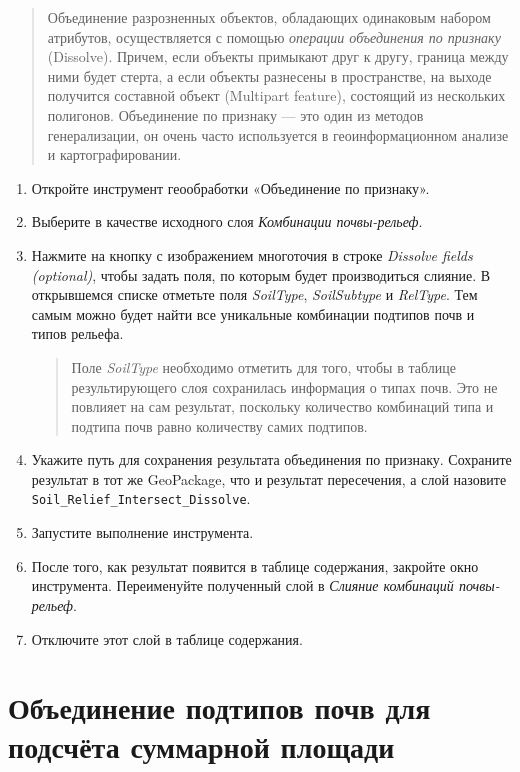 \documentclass[
  12pt,
]{book}
\begin{document}
\begin{quote}
Объединение разрозненных объектов, обладающих одинаковым набором атрибутов, осуществляется с помощью \emph{операции объединения по признаку} (Dissolve). Причем, если объекты примыкают друг к другу, граница между ними будет стерта, а если объекты разнесены в пространстве, на выходе получится составной объект (Multipart feature), состоящий из нескольких полигонов. Объединение по признаку --- это один из методов генерализации, он очень часто используется в геоинформационном анализе и картографировании.
\end{quote}

\begin{enumerate}
\def\labelenumi{\arabic{enumi}.}
\item
  Откройте инструмент геообработки «Объединение по признаку».
\item
  Выберите в качестве исходного слоя \emph{Комбинации почвы-рельеф}.
\item
  Нажмите на кнопку с изображением многоточия в строке \emph{Dissolve fields (optional)}, чтобы задать поля, по которым будет производиться слияние. В открывшемся списке отметьте поля \emph{SoilType}, \emph{SoilSubtype} и \emph{RelType}. Тем самым можно будет найти все уникальные комбинации подтипов почв и типов рельефа.

  \begin{quote}
  Поле \emph{SoilType} необходимо отметить для того, чтобы в таблице результирующего слоя сохранилась информация о типах почв. Это не повлияет на сам результат, поскольку количество комбинаций типа и подтипа почв равно количеству самих подтипов.
  \end{quote}
\item
  Укажите путь для сохранения результата объединения по признаку. Сохраните результат в тот же GeoPackage, что и результат пересечения, а слой назовите \texttt{Soil\_Relief\_Intersect\_Dissolve}.
\item
  Запустите выполнение инструмента.
\item
  После того, как результат появится в таблице содержания, закройте окно инструмента. Переименуйте полученный слой в \emph{Слияние комбинаций почвы-рельеф}.
\item
  Отключите этот слой в таблице содержания.
\end{enumerate}

\hypertarget{overlay-sumarea-subtypes}{%
\section{Объединение подтипов почв для подсчёта суммарной площади}\label{overlay-sumarea-subtypes}}
\end{document}
